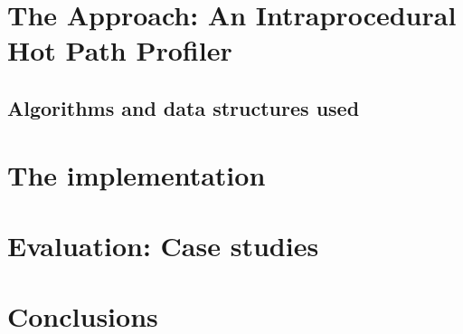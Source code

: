 \documentclass[a4paper,11pt]{report}
\begin{document}
\chapter{The Approach: An Intraprocedural Hot Path Profiler}


\section{Algorithms and data structures used}

\chapter{The implementation}


\chapter{Evaluation: Case studies}


\chapter{Conclusions}
\end{document}
